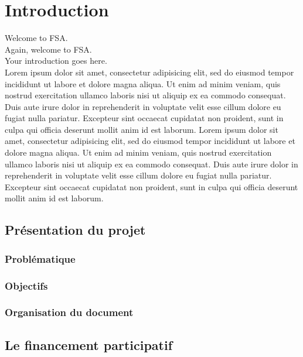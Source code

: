 

\chapter*{Introduction}
\label{chap:general_intorduction}
%
%

Welcome to \Ac{FSA}. ~\\
Again, welcome to \Ac{FSA}. ~\\
Your introduction goes here. ~\\

Lorem ipsum dolor sit amet, consectetur adipisicing elit, sed do eiusmod
tempor incididunt ut labore et dolore magna aliqua. Ut enim ad minim veniam,
quis nostrud exercitation ullamco laboris nisi ut aliquip ex ea commodo
consequat. Duis aute irure dolor in reprehenderit in voluptate velit esse
cillum dolore eu fugiat nulla pariatur. Excepteur sint occaecat cupidatat non
proident, sunt in culpa qui officia deserunt mollit anim id est laborum.
Lorem ipsum dolor sit amet, consectetur adipisicing elit, sed do eiusmod
tempor incididunt ut labore et dolore magna aliqua. Ut enim ad minim veniam,
quis nostrud exercitation ullamco laboris nisi ut aliquip ex ea commodo
consequat. Duis aute irure dolor in reprehenderit in voluptate velit esse
cillum dolore eu fugiat nulla pariatur. Excepteur sint occaecat cupidatat non
proident, sunt in culpa qui officia deserunt mollit anim id est laborum.


\section*{Présentation du projet}
\subsection*{Problématique}
\subsection*{Objectifs}
\subsection*{Organisation du document}


\section*{Le financement participatif}
